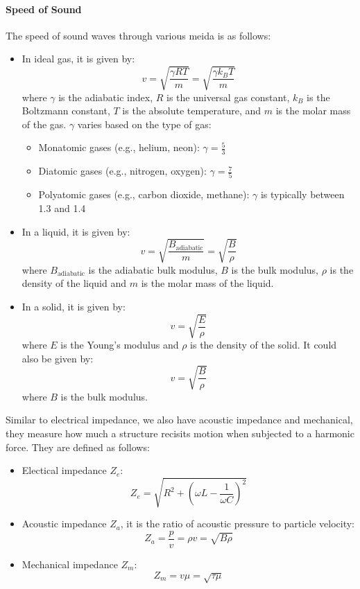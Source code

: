 \documentclass[11pt]{report}
\begin{document}
\paragraph{Speed of Sound} The speed of sound waves through various meida is as follows:
\begin{itemize}
    \item In ideal gas, it is given by:
    $$
        v = \sqrt{\frac{\gamma RT}{m}} = \sqrt{\frac{\gamma k_B T}{m}}
    $$
    where \( \gamma \) is the adiabatic index, \( R \) is the universal gas constant, \( k_B \) is the Boltzmann constant, \( T \) is the absolute temperature, and \( m \) is the molar mass of the gas. $\gamma$ varies based on the type of gas:
    \begin{itemize}
        \item Monatomic gases (e.g., helium, neon): \( \gamma = \frac{5}{3} \)
        \item Diatomic gases (e.g., nitrogen, oxygen): \( \gamma = \frac{7}{5} \)
        \item Polyatomic gases (e.g., carbon dioxide, methane): \( \gamma \) is typically between 1.3 and 1.4
    \end{itemize}
    \item In a liquid, it is given by:
    $$
        v = \sqrt{\frac{B_{\text{adiabatic}}}{m}} = \sqrt{\frac{B}{\rho}}
    $$
    where \(B_{\text{adiabatic}}\) is the adiabatic bulk modulus, \( B \) is the bulk modulus, \( \rho \) is the density of the liquid and \( m \) is the molar mass of the liquid.
    \item In a solid, it is given by:
    $$
        v = \sqrt{\frac{E}{\rho}} 
    $$
    where \( E \) is the Young's modulus and \( \rho \) is the density of the solid. It could also be given by:
    $$
        v = \sqrt{\frac{B}{\rho}}
    $$
    where \( B \) is the bulk modulus.
\end{itemize}

\begin{definition}[Impedance]
    Similar to electrical impedance, we also have acoustic impedance and mechanical, they measure how much a structure recisits motion when subjected to a harmonic force. They are defined as follows:
    \begin{itemize}
        \item Electical impedance \( Z_e \):
        $$
            Z_e = \sqrt{R^2 + \left(\omega L - \frac{1}{\omega C}\right)^2}
        $$
        \item Acoustic impedance \( Z_a \), it is the ratio of acoustic pressure to particle velocity:
        $$
            Z_a = \frac{p}{v} = \rho v = \sqrt{B\rho}
        $$
        \item Mechanical impedance \( Z_m \):
        $$
            Z_m = v\mu = \sqrt{\tau\mu}
        $$
    \end{itemize}
\end{definition}
\end{document}
